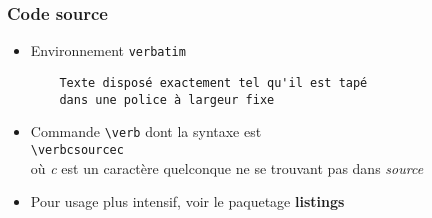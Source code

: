
\begin{frame}[fragile]

	\frametitle{Code source}
	
	\begin{itemize}
		\item Environnement \texttt{verbatim}
		\begin{codesource}
	\begin{verbatim}
	Texte disposé exactement tel qu'il est tapé
	dans une police à largeur fixe
	\end{verbatim}
		\end{codesource}
	
		\item Commande \texttt{\textbackslash verb} dont la syntaxe est \\
			\lstinline|\verbcsourcec| \\
			où \textit{c} est un caractère quelconque ne se trouvant pas dans \textit{source}
			
		\item Pour usage plus intensif, voir le paquetage \textbf{listings}
	\end{itemize}
\end{frame}
